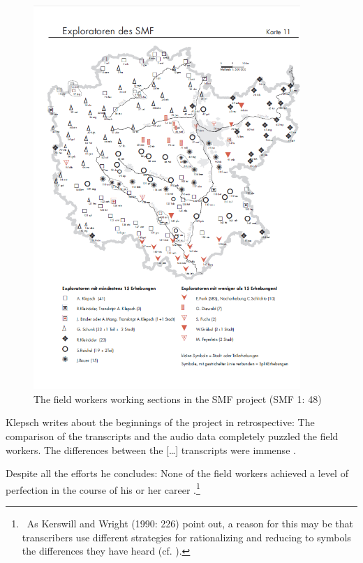 \documentclass[output=paper]{LSP/langsci}
\begin{document}
\begin{figure}
\includegraphics[width=0.9\textwidth]{illustrations/mathus_fig5}
\caption{The field workers{\textquotesingle} working sections in the SMF project (SMF 1: 48)}
\label{fig:5}
\end{figure}

Klepsch writes about the beginnings of the project in retrospective: {\textquotedbl}The comparison of the transcripts and the audio data completely puzzled the field workers. The differences between the […] transcripts were immense{\textquotedbl} \citep[25]{klepsch_wie_2013}.

Despite all the efforts he concludes: {\textquotedbl}None of the field workers achieved a level of perfection in the course of his or her career{\textquotedbl} \citep[27]{klepsch_wie_2013}.\footnote{\ As Kerswill and Wright (1990: 226) point out, a reason for this may be that transcribers use different strategies for {\textquotedbl}rationalizing and reducing to symbols the differences they have heard{\textquotedbl} (cf. \citealt[269]{kerswill_limits_1990}).}
\end{document}
